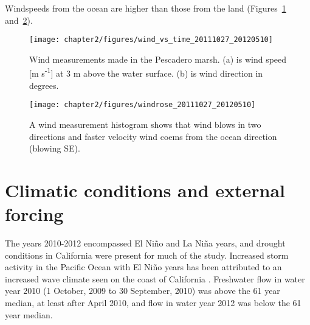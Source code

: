 Windspeeds from the ocean are higher than those from the land (Figures~\ref{fig:metstn_pdo_ws_wdir} and~\ref{fig:metstn_pdo_windrose}). 


\begin{figure} %
	\texttt{[image: chapter2/figures/wind\_vs\_time\_20111027\_20120510]} \caption{Wind measurements made in the Pescadero marsh. (a) is wind speed [m s\textsuperscript{-1}] at 3 m above the water surface. (b) is wind direction in degrees.}
\label{fig:metstn_pdo_ws_wdir} 
\end{figure}

 \begin{figure}
 	\begin{center}
 		\texttt{[image: chapter2/figures/windrose\_20111027\_20120510]} \caption{A wind measurement histogram shows that wind blows in two directions and faster velocity wind coems from the ocean direction (blowing SE).} \label{fig:metstn_pdo_windrose} 
 	\end{center}
 \end{figure}

\section{Climatic conditions and external forcing} \label{conditions_label}
The years 2010-2012 encompassed El Ni\~{n}o and La Ni\~{n}a years, and drought conditions in California were present for much of the study. Increased storm activity in the Pacific Ocean with El Ni\~{n}o years has been attributed to an increased wave climate seen on the coast of California \parencite{seymour_influence_1984}. Freshwater flow in water year 2010 (1 October, 2009 to 30 September, 2010) was above the 61 year median, at least after April 2010, and flow in water year 2012 was below the 61 year median. 


